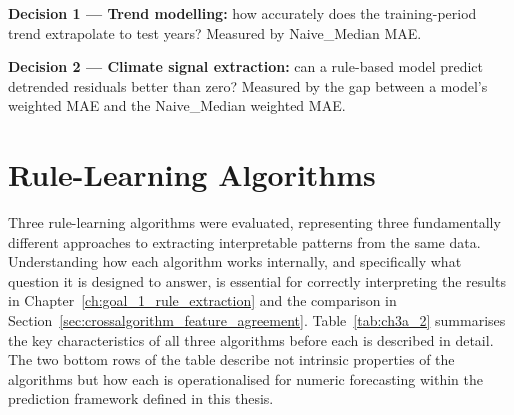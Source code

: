 \textbf{Decision 1 --- Trend modelling: }how accurately does the training-period trend extrapolate to test years? Measured by Naive\_Median MAE.

\textbf{Decision 2 --- Climate signal extraction: }can a rule-based model predict detrended residuals better than zero? Measured by the gap between a model's weighted MAE and the Naive\_Median weighted MAE.


\section{Rule-Learning Algorithms}\label{sec:rulelearning_algorithms}

Three rule-learning algorithms were evaluated, representing three fundamentally different approaches to extracting interpretable patterns from the same data. Understanding how each algorithm works internally, and specifically what question it is designed to answer, is essential for correctly interpreting the results in Chapter~\ref{ch:goal_1_rule_extraction} and the comparison in Section~\ref{sec:crossalgorithm_feature_agreement}. Table~\ref{tab:ch3a_2} summarises the key characteristics of all three algorithms before each is described in detail. The two bottom rows of the table describe not intrinsic properties of the algorithms but how each is operationalised for numeric forecasting within the prediction framework defined in this thesis.

